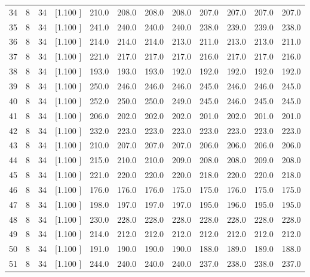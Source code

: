 \documentclass[12pt,a4paper]{article}
\begin{document}
\begin{center}
{\begin{tabular}{r r r r r r r r r r r r}
  34&  8& 34&[1.100     ]&   210.0&   208.0&   208.0&   208.0&   207.0&   207.0&   207.0&   207.0\\[-0.02in]
  35&  8& 34&[1.100     ]&   241.0&   240.0&   240.0&   240.0&   238.0&   239.0&   239.0&   238.0\\[-0.02in]
  36&  8& 34&[1.100     ]&   214.0&   214.0&   214.0&   213.0&   211.0&   213.0&   213.0&   211.0\\[-0.02in]
  37&  8& 34&[1.100     ]&   221.0&   217.0&   217.0&   217.0&   216.0&   217.0&   217.0&   216.0\\[-0.02in]
  38&  8& 34&[1.100     ]&   193.0&   193.0&   193.0&   192.0&   192.0&   192.0&   192.0&   192.0\\[-0.02in]
  39&  8& 34&[1.100     ]&   250.0&   246.0&   246.0&   246.0&   245.0&   246.0&   246.0&   245.0\\[-0.02in]
  40&  8& 34&[1.100     ]&   252.0&   250.0&   250.0&   249.0&   245.0&   246.0&   245.0&   245.0\\[-0.02in]
  41&  8& 34&[1.100     ]&   206.0&   202.0&   202.0&   202.0&   201.0&   202.0&   201.0&   201.0\\[-0.02in]
  42&  8& 34&[1.100     ]&   232.0&   223.0&   223.0&   223.0&   223.0&   223.0&   223.0&   223.0\\[-0.02in]
  43&  8& 34&[1.100     ]&   210.0&   207.0&   207.0&   207.0&   206.0&   206.0&   206.0&   206.0\\[-0.02in]
  44&  8& 34&[1.100     ]&   215.0&   210.0&   210.0&   209.0&   208.0&   208.0&   209.0&   208.0\\[-0.02in]
  45&  8& 34&[1.100     ]&   221.0&   220.0&   220.0&   220.0&   218.0&   220.0&   220.0&   218.0\\[-0.02in]
  46&  8& 34&[1.100     ]&   176.0&   176.0&   176.0&   175.0&   175.0&   176.0&   175.0&   175.0\\[-0.02in]
  47&  8& 34&[1.100     ]&   198.0&   197.0&   197.0&   197.0&   195.0&   196.0&   195.0&   195.0\\[-0.02in]
  48&  8& 34&[1.100     ]&   230.0&   228.0&   228.0&   228.0&   228.0&   228.0&   228.0&   228.0\\[-0.02in]
  49&  8& 34&[1.100     ]&   214.0&   212.0&   212.0&   212.0&   212.0&   212.0&   212.0&   212.0\\[-0.02in]
  50&  8& 34&[1.100     ]&   191.0&   190.0&   190.0&   190.0&   188.0&   189.0&   189.0&   188.0\\[-0.02in]
  51&  8& 34&[1.100     ]&   244.0&   240.0&   240.0&   240.0&   237.0&   238.0&   238.0&   237.0\\[-0.02in]

\end{tabular}}
\end{center}
\end{document}
